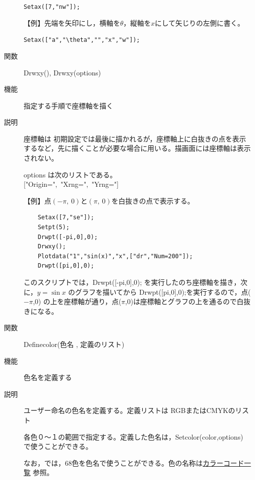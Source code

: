 \documentclass[papersize,a4paper,12pt,uplatex]{jsarticle}
\begin{document}
\begin{description}
\hspace{10mm}  \verb|Setax([7,"nw"]);|

【例】先端を矢印にし，横軸を$\theta$，縦軸を$x$にして矢じりの左側に書く。

\hspace{10mm} \verb|Setax(["a","\theta","","x","w"]);|

\vspace{\baselineskip}
\hspace{10mm}


\vspace{\baselineskip}
\hypertarget{drwxy}{}
\item[関数]  Drwxy(), Drwxy(options)
\item[機能]  指定する手順で座標軸を描く
\item[説明]  座標軸は 初期設定では最後に描かれるが，座標軸上に白抜きの点を表示するなど，先に描くことが必要な場合に用いる。描画面には座標軸は表示されない。

options は次のリストである。\\
\hspace*{10mm}["Origin=",\ "Xrng=",\ "Yrng="]

【例】点$(-\pi,\ 0)$と$(\pi,\ 0)$を白抜きの点で表示する。
\begin{verbatim}
    Setax([7,"se"]);
    Setpt(5);
    Drwpt([-pi,0],0);
    Drwxy();
    Plotdata("1","sin(x)","x",["dr","Num=200"]);
    Drwpt([pi,0],0);
\end{verbatim}

  このスクリプトでは，Drwpt([-pi,0],0); を実行したのち座標軸を描き，次に，$y=\sin x$ のグラフを描いてから Drwpt([pi,0],0);を実行するので，点($-\pi$,0) の上を座標軸が通り，点($\pi$,0)は座標軸とグラフの上を通るので白抜きになる。\\

\begin{center} \end{center}


\vspace{\baselineskip}
\hypertarget{definecolor}{}
\item[関数]  Definecolor(色名 , 定義のリスト)
\item[機能]  色名を定義する
\item[説明]  ユーザー命名の色名を定義する。定義リストは RGBまたはCMYKのリスト

各色０〜１の範囲で指定する。定義した色名は，Setcolor(color,options)  で使うことができる。

なお，\ketcindy では，68色を色名で使うことができる。色の名称は\hyperlink{colorcodelist}{カラーコード一覧} 参照。


\end{description}
\end{document}
